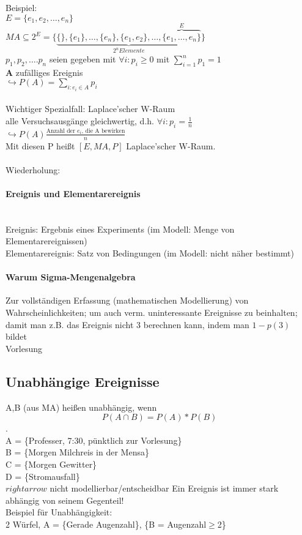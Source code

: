 \documentclass[a4paper,12pt]{scrartcl}
\begin{document}
Beispiel:\\
$E = \{e_1,e_2,\dots,e_n\}$\\
$MA\subseteq 2^E = \{\underbrace{\{\},\{e_1\},\dots,\{e_n\},\{e_1,e_2\},\dots,\overbrace{\{e_1,\dots,e_n\}}^E}_{2^n Elemente}\}$\\
$p_1,p_2,\dots.p_n$ seien gegeben mit $\forall i: p_i\geq 0$ mit $\sum^{n}_{i=1}p_1 = 1$\\
\textbf{A} zufälliges Ereignis\\
$\hookrightarrow  P(A) = \sum_{i: e_i\in A} p_i$\\
\\
Wichtiger Spezialfall: Laplace'scher W-Raum\\
alle Versuchsausgänge gleichwertig, d.h. $\forall i: p_i = \frac{1}{n}$\\
$\hookrightarrow P(A) \frac{\text{Anzahl der } e_i\text{, die A bewirken}}{n}$\\
Mit diesen P heißt $[E,MA,P]$ Laplace'scher W-Raum.
\\
\\
Wiederholung:
\paragraph{Ereignis und Elementarereignis} \quad\\
Ereignis: Ergebnis eines Experiments (im Modell: Menge von Elementarereignissen)\\ 
Elementarereignis: Satz von Bedingungen (im Modell: nicht näher bestimmt)
\paragraph{Warum Sigma-Mengenalgebra} Zur vollständigen Erfassung (mathematischen Modellierung) von Wahrscheinlichkeiten; um auch verm. uninteressante Ereignisse zu beinhalten; damit man z.B. das Ereignis \glqq{}nicht 3\grqq{} berechnen kann, indem man $1-p(3)$ bildet
\\
Vorlesung
\\
\subsection{Unabhängige Ereignisse} 
A,B (aus MA) heißen unabhängig, wenn $$P(A\cap B) = P(A) * P(B)$$.\\
A = \{Professer, 7:30, pünktlich zur Vorlesung\}\\
B = \{Morgen Milchreis in der Mensa\}\\
C = \{Morgen Gewitter\}\\
D = \{Stromausfall\}\\
$rightarrow$ nicht modellierbar/entscheidbar
Ein Ereignis ist immer stark abhängig von seinem Gegenteil!\\
Beispiel für Unabhängigkeit:\\
2 Würfel, A = \{Gerade Augenzahl\}, \{B = Augenzahl$\geq$2\}\\
\end{document}
